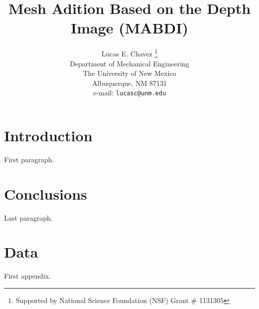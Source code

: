 \documentclass{eeceTR}
\title{Mesh Adition Based on the Depth Image (MABDI)}
\author{Lucas E. Chavez \thanks{Supported by National Science Foundation (NSF) Grant # 1131305 }\\
Department of Mechanical Engineering\\
The University of New Mexico\\
Albuquerque, NM 87131\\
e-mail: {\tt lucasc@unm.edu}
}
\begin{document}
\maketitle
\makeabstract

\section{Introduction}

First paragraph. \cite{JAJA92}

\section{Conclusions}

Last paragraph.

\appendix

\section{Data}
First appendix.



\end{document}
